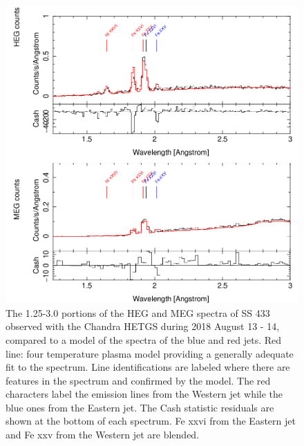 \begin{figure}
    \centering
    \includegraphics[width = \linewidth]{Chapters/Figures/long_plasma_whole1.png}
    \caption{The 1.25-3.0 portions of the HEG and MEG spectra of SS 433 observed with the Chandra HETGS during 2018 August 13 - 14, compared to a model of the spectra of the blue and red jets. Red line: four temperature plasma model providing a generally adequate fit to the spectrum. Line identifications are labeled where there are features in the spectrum and confirmed by the model. The red characters label the emission lines from the Western jet while the blue ones from the Eastern jet. The Cash statistic residuals are shown at the bottom of each spectrum. Fe {\sc xxvi} from the Eastern jet and Fe {\sc xxv} from the Western jet are blended.}
    \label{long_plasma1}
\end{figure}


